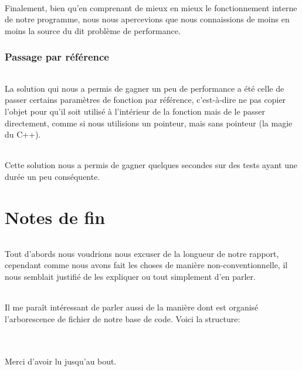 \documentclass[french]{article}
\begin{document}
\paragraph{} Finalement, bien qu'en comprenant de mieux en mieux le
fonctionnement interne de notre programme, nous nous apercevions que nous
connaissions de moins en moins la source du dit problème de performance.

\section{Passage par référence}

\paragraph{} La solution qui nous a permis de gagner un peu de performance a
été celle de passer certains paramètres de fonction par référence, c'est-à-dire
ne pas copier l'objet pour qu'il soit utilisé à l'intérieur de la fonction mais
de le passer directement, comme si nous utilisions un pointeur, mais sans
pointeur (la magie du C++).

\paragraph{} Cette solution nous a permis de gagner quelques secondes sur des
tests ayant une durée un peu conséquente.

\part{Notes de fin}

\paragraph{} Tout d'abords nous voudrions nous excuser de la longueur de notre
rapport, cependant comme nous avons fait les choses de manière
non-conventionnelle, il nous semblait justifié de les expliquer ou tout
simplement d'en parler.

\paragraph{} Il me paraît intéressant de parler aussi de la manière dont est
organisé l'arborescence de fichier de notre base de code. Voici la structure:
\\

~\\~\\

\hfill Merci d'avoir lu jusqu'au bout.

\printbibliography%
\end{document}
